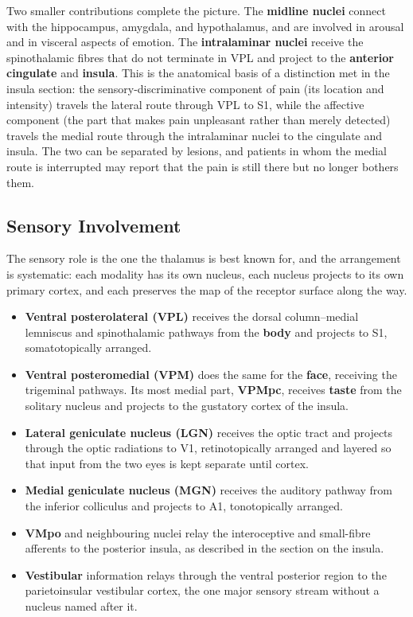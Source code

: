 \documentclass[11pt]{article}
\begin{document}
Two smaller contributions complete the picture. The \textbf{midline nuclei} connect with the hippocampus, amygdala, and hypothalamus, and are involved in arousal and in visceral aspects of emotion. The \textbf{intralaminar nuclei} receive the spinothalamic fibres that do not terminate in VPL and project to the \textbf{anterior cingulate} and \textbf{insula}. This is the anatomical basis of a distinction met in the insula section: the sensory-discriminative component of pain (its location and intensity) travels the lateral route through VPL to S1, while the affective component (the part that makes pain unpleasant rather than merely detected) travels the medial route through the intralaminar nuclei to the cingulate and insula. The two can be separated by lesions, and patients in whom the medial route is interrupted may report that the pain is still there but no longer bothers them.

\subsection{Sensory Involvement}

The sensory role is the one the thalamus is best known for, and the arrangement is systematic: each modality has its own nucleus, each nucleus projects to its own primary cortex, and each preserves the map of the receptor surface along the way.

\begin{itemize}
    \item \textbf{Ventral posterolateral (VPL)} receives the dorsal column--medial lemniscus and spinothalamic pathways from the \textbf{body} and projects to S1, somatotopically arranged.
    \item \textbf{Ventral posteromedial (VPM)} does the same for the \textbf{face}, receiving the trigeminal pathways. Its most medial part, \textbf{VPMpc}, receives \textbf{taste} from the solitary nucleus and projects to the gustatory cortex of the insula.
    \item \textbf{Lateral geniculate nucleus (LGN)} receives the optic tract and projects through the optic radiations to V1, retinotopically arranged and layered so that input from the two eyes is kept separate until cortex.
    \item \textbf{Medial geniculate nucleus (MGN)} receives the auditory pathway from the inferior colliculus and projects to A1, tonotopically arranged.
    \item \textbf{VMpo} and neighbouring nuclei relay the interoceptive and small-fibre afferents to the posterior insula, as described in the section on the insula.
    \item \textbf{Vestibular} information relays through the ventral posterior region to the parietoinsular vestibular cortex, the one major sensory stream without a nucleus named after it.
\end{itemize}
\end{document}
